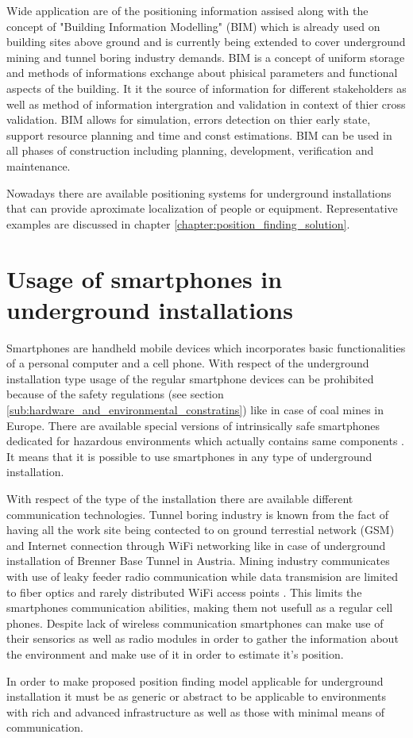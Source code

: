 \documentclass[../main.tex]{subfiles}
\begin{document}
Wide application are of the positioning information assised along with the concept of "Building Information Modelling" (BIM) which is already used on building sites above ground and is currently being extended to cover underground mining and tunnel boring industry demands. BIM is a concept of uniform storage and methods of informations  exchange about phisical parameters and functional aspects of the building. It it the source of information for different stakeholders as well as method of information intergration and validation in context of thier cross validation. BIM allows for simulation, errors detection on thier early state, support resource planning and time and const estimations. BIM can be used in all phases of construction including planning, development, verification and maintenance.


Nowadays there are available positioning systems for underground installations that can provide aproximate localization of people or equipment. Representative examples are discussed in chapter \ref{chapter:position_finding_solution}.


\section{Usage of smartphones in underground installations}

Smartphones are handheld mobile devices which incorporates basic functionalities of a personal computer and a cell phone. With respect of the underground installation type usage of the regular smartphone devices can be prohibited because of the safety regulations (see section \ref{sub:hardware_and_environmental_constratins}) like in case of coal mines in Europe\cite{Thesis_CM}. There are available special versions of intrinsically safe smartphones dedicated for hazardous environments which actually contains same components \cite{misc_atex_smartphone_brochure}. It means that it is possible to use smartphones in any type of underground installation.

With respect of the type of the installation there are available different communication technologies. Tunnel boring industry is known from the fact of having all the work site being contected to on ground terrestial network (GSM) and Internet connection through WiFi networking like in case of underground installation of Brenner Base Tunnel in Austria. Mining industry communicates with use of leaky feeder radio communication while data transmision are limited to fiber optics and rarely distributed WiFi access points \cite{thesis_tablet_positioning}. This limits the smartphones communication abilities, making them not usefull as a regular cell phones. Despite lack of wireless communication smartphones can make use of their sensorics as well as radio modules in order to gather the information about the environment and make use of it in order to estimate it's position.

In order to make proposed position finding model applicable for underground installation it must be as generic or abstract to be applicable to environments with rich and advanced infrastructure as well as those with minimal means of communication.
\end{document}
